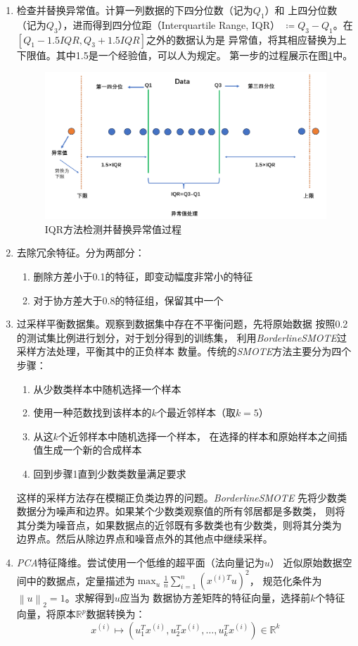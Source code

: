 \begin{enumerate}
    \item 检查并替换异常值。计算一列数据的下四分位数（记为$Q_1$）和
    上四分位数（记为$Q_3$），进而得到四分位距（Interquartile Range, IQR）
    $\coloneqq Q_3-Q_1$。在$[Q_1-1.5IQR, Q_3+1.5IQR]$之外的数据认为是
    异常值，将其相应替换为上下限值。其中1.5是一个经验值，可以人为规定。
    第一步的过程展示在图\ref{fig:IQR-outlier-detection}中。
    \begin{figure}[h]
        \centering
        \includegraphics[width=.6\textwidth]{images/IQR_outlier_selection.png}
        \caption{IQR方法检测并替换异常值过程}
        \label{fig:IQR-outlier-detection}
    \end{figure}
    \item 去除冗余特征。分为两部分：
    \begin{enumerate}
        \item 删除方差小于0.1的特征，即变动幅度非常小的特征
        \item 对于协方差大于0.8的特征组，保留其中一个
    \end{enumerate}
    \item 过采样平衡数据集。观察到数据集中存在不平衡问题，先将原始数据
    按照0.2的测试集比例进行划分，对于划分得到的训练集，
    利用\textit{BorderlineSMOTE}过采样方法处理，平衡其中的正负样本
    数量。传统的\textit{SMOTE}方法主要分为四个步骤：
    \begin{enumerate}
        \item 从少数类样本中随机选择一个样本
        \item 使用一种范数找到该样本的$k$个最近邻样本（取$k=5$）
        \item 从这$k$个近邻样本中随机选择一个样本，
        在选择的样本和原始样本之间插值生成一个新的合成样本
        \item 回到步骤1直到少数类数量满足要求
    \end{enumerate}
    这样的采样方法存在模糊正负类边界的问题。\textit{BorderlineSMOTE}
    先将少数类数据分为噪声和边界。如果某个少数类观察值的所有邻居都是多数类，
    则将其分类为噪音点，如果数据点的近邻既有多数类也有少数类，则将其分类为
    边界点。然后从除边界点和噪音点外的其他点中继续采样。
    \item \textit{PCA}特征降维。尝试使用一个低维的超平面（法向量记为$u$）
    近似原始数据空间中的数据点，定量描述为$\max_u \frac{1}{n}\sum_{i=1}^{n}(x^{(i)T}u)^2$，
    规范化条件为$\left\lVert u\right\rVert _2 =1$。求解得到$u$应当为
    数据协方差矩阵的特征向量，选择前$k$个特征向量，将原本$\mathbb{R}^{p}$数据转换为：
    \begin{equation*}
    x^{(i)} \mapsto (u_1^T x^{(i)},u_2^T x^{(i)},\ldots,u_k^T x^{(i)})\in
    \mathbb{R}^k
    \end{equation*}
\end{enumerate}

